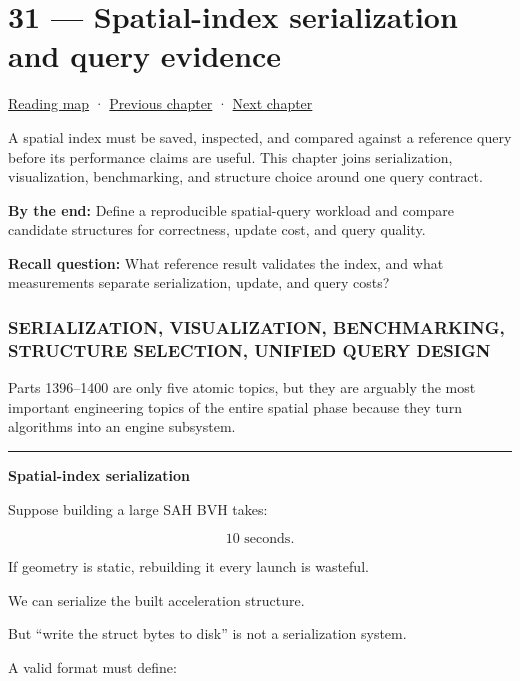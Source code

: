 \hypertarget{06-engine-ii-ch031}{}
\section{31 --- Spatial-index serialization and query evidence}\label{spatial-index-serialization-and-query-evidence}

\href{Chapter\%20Edition/03\%20-\%20Game\%20Engine/00\%20-\%20Reading\%20Map}{Reading map} · \hyperref[06-engine-ii-ch030]{Previous chapter} · \hyperref[06-engine-ii-ch032]{Next chapter}

A spatial index must be saved, inspected, and compared against a reference query before its performance claims are useful. This chapter joins serialization, visualization, benchmarking, and structure choice around one query contract.

\textbf{By the end:} Define a reproducible spatial-query workload and compare candidate structures for correctness, update cost, and query quality.

\textbf{Recall question:} What reference result validates the index, and what measurements separate serialization, update, and query costs?

\subsubsection{SERIALIZATION, VISUALIZATION, BENCHMARKING, STRUCTURE SELECTION, UNIFIED QUERY DESIGN}\label{serialization-visualization-benchmarking-structure-selection-unified-query-design}

Parts 1396--1400 are only five atomic topics, but they are arguably the most important engineering topics of the entire spatial phase because they turn algorithms into an engine subsystem.

\begin{center}\rule{0.5\linewidth}{0.5pt}\end{center}

\textbf{Spatial-index serialization}

Suppose building a large SAH BVH takes:

\[
10\text{ seconds}.
\]

If geometry is static, rebuilding it every launch is wasteful.

We can serialize the built acceleration structure.

But ``write the struct bytes to disk'' is not a serialization system.

A valid format must define:

